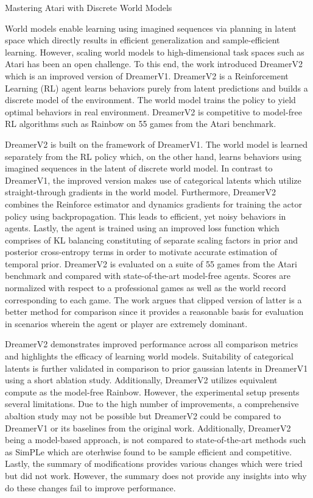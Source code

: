 \documentclass[11pt,letterpaper]{article}
\begin{document}
\begin{center}
  \large{Mastering Atari with Discrete World Models}
\end{center}
World models enable learning using imagined sequences via planning in latent space which directly results in efficient generalization and sample-efficient learning. However, scaling world models to high-dimensional task spaces such as Atari has been an open challenge. To this end, the work introduced DreamerV2 which is an improved version of DreamerV1. DreamerV2 is a Reinforcement Learning (RL) agent learns behaviors purely from latent predictions and builds a discrete model of the environment. The world model trains the policy to yield optimal behaviors in real environment. DreamerV2 is competitive to model-free RL algorithms such as Rainbow on 55 games from the Atari benchmark.

DreamerV2 is built on the framework of DreamerV1. The world model is learned separately from the RL policy which, on the other hand, learns behaviors using imagined sequences in the latent of discrete world model. In contrast to DreamerV1, the improved version makes use of categorical latents which utilize straight-through gradients in the world model. Furthermore, DreamerV2 combines the Reinforce estimator and dynamics gradients for training the actor policy using backpropagation. This leads to efficient, yet noisy behaviors in agents. Lastly, the agent is trained using an improved loss function which comprises of KL balancing constituting of separate scaling factors in prior and posterior cross-entropy terms in order to motivate accurate estimation of temporal prior. DreamerV2 is evaluated on a suite of 55 games from the Atari benchmark and compared with state-of-the-art model-free agents. Scores are normalized with respect to a professional games as well as the world record corresponding to each game. The work argues that clipped version of latter is a better method for comparison since it provides a reasonable basis for evaluation in scenarios wherein the agent or player are extremely dominant.

DreamerV2 demonstrates improved performance across all comparison metrics and highlights the efficacy of learning world models. Suitability of categorical latents is further validated in comparison to prior gaussian latents in DreamerV1 using a short ablation study. Additionally, DreamerV2 utilizes equivalent compute as the model-free Rainbow. However, the experimental setup presents several limitations. Due to the high number of improvements, a comprehensive abaltion study may not be possible but DreamerV2 could be compared to DreamerV1 or its baselines from the original work. Additionally, DreamerV2 being a model-based approach, is not compared to state-of-the-art methods such as SimPLe which are oterhwise found to be sample efficient and competitive. Lastly, the summary of modifications provides various changes which were tried but did not work. However, the summary does not provide any insights into why do these changes fail to improve performance. 
\end{document}
